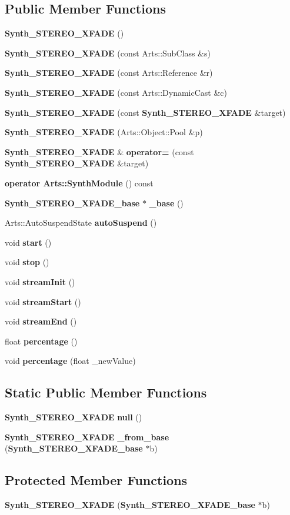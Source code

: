 \subsection*{Public Member Functions}
\begin{CompactItemize}
\item 
{\bf Synth\_\-STEREO\_\-XFADE} ()
\item 
{\bf Synth\_\-STEREO\_\-XFADE} (const Arts::Sub\-Class \&s)
\item 
{\bf Synth\_\-STEREO\_\-XFADE} (const Arts::Reference \&r)
\item 
{\bf Synth\_\-STEREO\_\-XFADE} (const Arts::Dynamic\-Cast \&c)
\item 
{\bf Synth\_\-STEREO\_\-XFADE} (const {\bf Synth\_\-STEREO\_\-XFADE} \&target)
\item 
{\bf Synth\_\-STEREO\_\-XFADE} (Arts::Object::Pool \&p)
\item 
{\bf Synth\_\-STEREO\_\-XFADE} \& {\bf operator=} (const {\bf Synth\_\-STEREO\_\-XFADE} \&target)
\item 
{\bf operator Arts::Synth\-Module} () const 
\item 
{\bf Synth\_\-STEREO\_\-XFADE\_\-base} $\ast$ {\bf \_\-base} ()
\item 
Arts::Auto\-Suspend\-State {\bf auto\-Suspend} ()
\item 
void {\bf start} ()
\item 
void {\bf stop} ()
\item 
void {\bf stream\-Init} ()
\item 
void {\bf stream\-Start} ()
\item 
void {\bf stream\-End} ()
\item 
float {\bf percentage} ()
\item 
void {\bf percentage} (float \_\-new\-Value)
\end{CompactItemize}
\subsection*{Static Public Member Functions}
\begin{CompactItemize}
\item 
{\bf Synth\_\-STEREO\_\-XFADE} {\bf null} ()
\item 
{\bf Synth\_\-STEREO\_\-XFADE} {\bf \_\-from\_\-base} ({\bf Synth\_\-STEREO\_\-XFADE\_\-base} $\ast$b)
\end{CompactItemize}
\subsection*{Protected Member Functions}
\begin{CompactItemize}
\item 
{\bf Synth\_\-STEREO\_\-XFADE} ({\bf Synth\_\-STEREO\_\-XFADE\_\-base} $\ast$b)
\end{CompactItemize}
